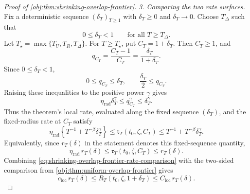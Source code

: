 \begin{proof}[Proof of \cref{obj:thm:shrinking-overlap-frontier}]
\emph{3. Comparing the two rate surfaces.}
Fix a deterministic sequence \((\delta_T)_{T\ge1}\) with
\(\delta_T\ge0\) and \(\delta_T\to0\).  Choose \(T_\Delta\) such that
\[
0\le\delta_T<1\qquad\text{for all }T\ge T_\Delta .
\]
Let \(T_\star=\max\{T_U,T_R,T_\Delta\}\).  For \(T\ge T_\star\), put
\(C_T=1+\delta_T\).  Then \(C_T\ge1\), and
\[
q_{C_T}
=
\frac{C_T-1}{C_T}
=
\frac{\delta_T}{1+\delta_T}.
\]
Since \(0\le\delta_T<1\),
\[
0\le q_{C_T}\le\delta_T,
\qquad
\frac{\delta_T}{2}\le q_{C_T}.
\]
Raising these inequalities to the positive power \(\gamma\) gives
\[
\eta_{\mathrm{rad}}\delta_T^\gamma
\le
q_{C_T}^\gamma
\le
\delta_T^\gamma .
\]
Thus the theorem's local rate, evaluated along the fixed sequence \((\delta_T)\), and the fixed-radius rate at \(C_T\) satisfy
\begin{equation}\label{eq:shrinking-overlap-frontier-rate-comparison}
\eta_{\mathrm{rad}}\left\{T^{-1}+T^{-\beta}\delta_T^\gamma\right\}
\le
\mathfrak r_T(t_0,\zeta,C_T)
\le
T^{-1}+T^{-\beta}\delta_T^\gamma.
\end{equation}
Equivalently, since \(r_T(\delta)\) in the statement denotes this fixed-sequence quantity,
\[
\eta_{\mathrm{rad}}\,r_T(\delta)
\le
\mathfrak r_T(t_0,\zeta,C_T)
\le
r_T(\delta).
\]
Combining \cref{eq:shrinking-overlap-frontier-rate-comparison} with the two-sided comparison from
\cref{obj:thm:uniform-overlap-frontier} gives
\begin{equation}\label{eq:shrinking-overlap-frontier-risk-comparison}
c_{\mathrm{loc}}\,r_T(\delta)
\le
R_T(t_0,\zeta,1+\delta_T)
\le
C_{\mathrm{loc}}\,r_T(\delta).
\end{equation}


\end{proof}
